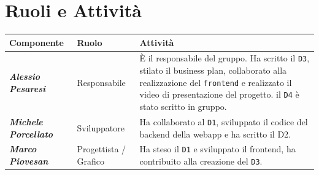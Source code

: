 \section{Ruoli e Attivit\`a}

\begin{table}[H]
    \centering
    \small
    \begin{tabular}{|p{2.4cm}|p{3.2cm}|p{9cm}|}
        \hline
        \textbf{Componente} & \textbf{Ruolo} & \textbf{Attivit\`a} \\
        \hline 
        \textbf{\textit{Alessio} \newline \textit{Pesaresi}} & Responsabile & \`E il responsabile del gruppo. Ha scritto il \texttt{D3}, stilato il business plan, collaborato alla realizzazione del \texttt{frontend} e realizzato il video di presentazione del progetto. il \texttt{D4} è stato scritto in gruppo.\\
        \hline
        \textbf{\textit{Michele} \newline \textit{Porcellato}} & Sviluppatore & Ha collaborato al \texttt{D1}, sviluppato il codice del backend della webapp e ha scritto il D2. \\
        \hline
        \textbf{\textit{Marco} \newline \textit{Piovesan}} & Progettista / \newline Grafico & Ha steso il \texttt{D1} e sviluppato il frontend, ha contribuito alla creazione del \texttt{D3}. \\
        \hline
    \end{tabular}
\end{table}
\newpage{}